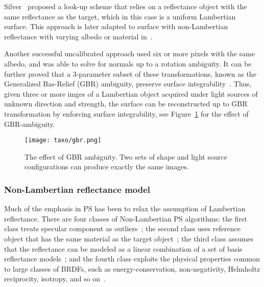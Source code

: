 Silver~\cite{silver1980determining} proposed a look-up scheme that relies on a reflectance object with the same reflectance as the target, which in this case is a uniform Lambertian surface. This approach is later adapted to surface with non-Lambertian reflectance with varying albedo or material in~\cite{hertzmann2005example}.

Another successful uncalibrated approach used six or more pixels with the same albedo, and was able to solve for normals up to a rotation ambiguity\cite{hayakawa1994photometric}. It can be further proved that a 3-parameter subset of these transformations, known as the Generalized Bas-Relief (GBR) ambiguity, preserve surface integrability~\cite{belhumeur1999bas}. Thus, given three or more imges of a Lambertian object acquired under light sources of unknown direction and strength, the surface can be reconstructed up to GBR transformation by enforcing surface integrability, see Figure~\ref{fig:gbr} for the effect of GBR-ambiguity.
\begin{figure}[!htbp]
\centering
\texttt{[image: taxo/gbr.png]}
\caption{The effect of GBR ambiguity. Two sets of shape and light source configurations can produce exactly the same images.}
\label{fig:gbr}
\end{figure}

\subsubsection{Non-Lambertian reflectance model}
Much of the emphasis in PS has been to relax the assumption of Lambertian reflectance. There are four classes of Non-Lambertian PS algorithms: the first class treats specular component as outliers~\cite{coleman1982obtaining,barsky20034,ikeuchi1981determining,nayar1990determining}; the second class uses reference object that has the same material as the target object~\cite{hertzmann2005example}; the third class assumes that the reflectance can be modeled as a linear combination of a set of basis reflectance models~\cite{goldman2010shape,alldrin2008photometric}; and the fourth class exploits the physical properties common to large classes of BRDFs, such as energy-conservation, non-negativity, Helmholtz reciprocity, isotropy, and so on~\cite{zickler2002helmholtz,tan2007isotropy,alldrin2007toward}.


